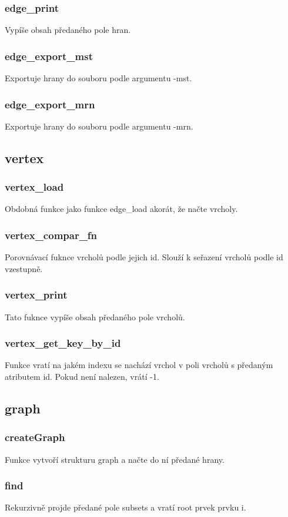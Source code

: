 \documentclass[12pt, a4paper]{report}
\begin{document}
\subsubsection{edge\_print}
Vypíše obsah předaného pole hran.
%
%
%
\subsubsection{edge\_export\_mst}
Exportuje hrany do souboru podle argumentu -mst.
%
%
%
\subsubsection{edge\_export\_mrn}
Exportuje hrany do souboru podle argumentu -mrn.
%
%
%
%
\subsection{vertex}
%
%
%
\subsubsection{vertex\_load}
Obdobná funkce jako funkce edge\_load akorát, že načte vrcholy.
%
%
%
\subsubsection{vertex\_compar\_fn}
Porovnávací fuknce vrcholů podle jejich id. Slouží k seřazení vrcholů podle id vzestupně.
%
%
%
\subsubsection{vertex\_print}
Tato fuknce vypíše obsah předaného pole vrcholů.
%
%
%
\subsubsection{vertex\_get\_key\_by\_id}
Funkce vratí na jakém indexu se nachází vrchol v poli vrcholů s předaným atributem id. Pokud není nalezen, vrátí -1.
%
%
%
%
\subsection{graph}
%
%
%
\subsubsection{createGraph}
Funkce vytvoří strukturu graph a načte do ní předané hrany.
%
%
%
\subsubsection{find}
Rekurzivně projde předané pole subsets a vratí root prvek prvku i.
%
%
%
\end{document}
